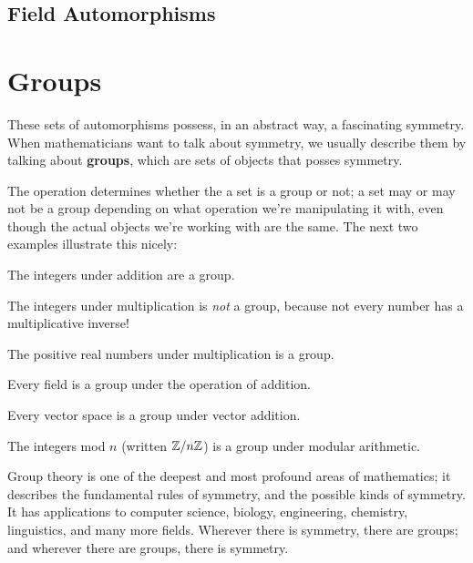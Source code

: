 \subsection{Field Automorphisms}

\section{Groups}

These sets of automorphisms possess, in an abstract way, a fascinating symmetry. When mathematicians want to talk about symmetry, we usually describe them by talking about \textbf{groups}, which are sets of objects that posses symmetry.


The operation determines whether the a set is a group or not; a set may or may not be a group depending on what operation we're manipulating it with, even though the actual objects we're working with are the same. The next two examples illustrate this nicely:

\begin{example}
    The integers under addition are a group.
\end{example}

\begin{example}
    The integers under multiplication is \textit{not} a group, because not every number has a multiplicative inverse!
\end{example}

\begin{example}
    The positive real numbers under multiplication is a group.
\end{example}

\begin{example}
    Every field is a group under the operation of addition.
\end{example}

\begin{example}
    Every vector space is a group under vector addition.
\end{example}

\begin{example}
    The integers mod $n$ (written $\mathbb{Z}/n\mathbb{Z}$) is a group under modular arithmetic.
\end{example}

Group theory is one of the deepest and most profound areas of mathematics; it describes the fundamental rules of symmetry, and the possible kinds of symmetry. It has applications to computer science, biology, engineering, chemistry, linguistics, and many more fields. Wherever there is symmetry, there are groups; and wherever there are groups, there is symmetry.

